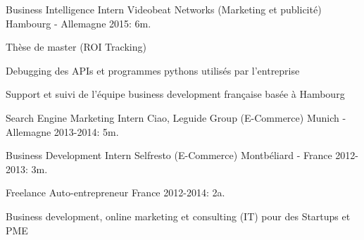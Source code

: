 \begin{cventries}
  \cventry
    {Business Intelligence Intern} %
    {Videobeat Networks (Marketing et publicité)} %
    {Hambourg - Allemagne} %
    {2015: 6m.} %
    {
      \begin{cvitems} %
       \item {Thèse de master (ROI Tracking)}
        \item {Debugging des APIs et programmes pythons utilisés par l'entreprise}
        \item {Support et suivi de l'équipe business development française basée à Hambourg}
      \end{cvitems}
    }

  \cventry
    {Search Engine Marketing Intern} %
    {Ciao, Leguide Group (E-Commerce)} %
    {Munich - Allemagne} %
    {2013-2014: 5m.} %
    {
    }
    
	\cventry
	{Business Development Intern} %
	{Selfresto (E-Commerce)} %
	{Montbéliard - France} %
	{2012-2013: 3m.} %
	{
	}
	
  \cventry
    {Freelance} %
    {Auto-entrepreneur} %
    {France} %
    {2012-2014: 2a.} %
    {	
      \begin{cvitems} %
      	\item{Business development, online marketing et consulting (IT) pour des Startups et PME}
      \end{cvitems}
    }

\end{cventries}
